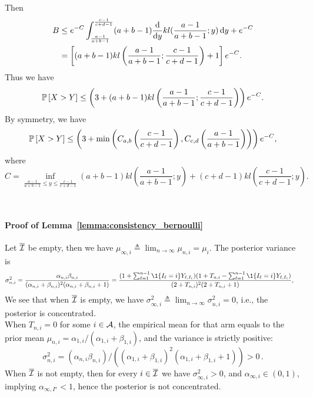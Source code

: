 	Then
	\begin{align*}
	B &\leq e^{-C} \int_{\frac{a-1}{a+b-1}}^{\frac{c-1}{c+d-1}} (a+b-1) \frac{\mathop{}\!\mathrm{d}{}}{\mathop{}\!\mathrm{d}{y}} kl (\frac{a-1}{a+b-1}; y) \mathop{}\!\mathrm{d}{y}  + e^{-C} \\
	&= \left[ (a+b-1) kl\left(\frac{a-1}{a+b-1}; \frac{c-1}{c+d-1}\right)  + 1 \right] e^{-C}.
	\end{align*}
	Thus we have
	\begin{align*}
	\mathbb{P}\left[X > Y\right] \leq \left( 3 + (a+b-1) kl\left(\frac{a-1}{a+b-1}; \frac{c-1}{c+d-1}\right)  \right) e^{-C}.
	\end{align*}
	By symmetry, we have
	\begin{align*}
	\mathbb{P}\left[X > Y\right] \leq \left(3 + \min \left(C_{a,b}\left(\frac{c-1}{c+d-1}\right), C_{c,d}\left(\frac{a-1}{a+b-1}\right)\right)\right) e^{-C},
	\end{align*}
	where
	\[
	    C = \inf_{\frac{a-1}{a+b-1} \leq y \leq \frac{c-1}{c+d-1}} (a+b-1) kl\left(\frac{a-1}{a+b-1}; y\right) + (c+d-1) kl\left(\frac{c-1}{c+d-1} ; y\right).
	\]

\hfill\BlackBox\\[2mm]

\paragraph{Proof of Lemma~\ref{lemma:consistency_bernoulli}} 

Let $\overline{\mathcal{I}}$ be empty, then we have $\mu_{\infty, i} \triangleq \lim_{n \rightarrow \infty} \mu_{n,i} = \mu_i$. The posterior variance is
\begin{align*}
\sigma_{n,i}^2 &= \frac{\alpha_{n,i}\beta_{n,i}}{(\alpha_{n,i}+ \beta_{n,i})^2 (\alpha_{n,i} + \beta_{n,i} + 1)} 
= \frac{(1 + \sum_{\ell=1}^{n-1} \1{\{ I_{\ell} = i \}} Y_{\ell,I_{\ell}}) (1 + T_{n,i} - \sum_{\ell=1}^{n-1} \1{\{ I_{\ell} = i \}} Y_{\ell,I_{\ell}})  }{ (2 + T_{n,i})^2 (2 + T_{n,i} +1 )   },
\end{align*}
We see that when $\overline{\mathcal{I}}$ is empty, we have $\sigma_{\infty, i}^2 \triangleq \lim_{n \rightarrow \infty} \sigma_{n,i}^2 = 0$, i.e., the posterior is concentrated. \\

When $T_{n,i} = 0$ for some $i \in \mathcal{A}$, the empirical mean for that arm equals to the prior mean $\mu_{n,i} = \alpha_{1,i} / (\alpha_{1,i} + \beta_{1,i})$, and the variance is strictly positive: 
\[
    \sigma^2_{n,i} = (\alpha_{n,i}\beta_{n,i}) / \left((\alpha_{1,i}+ \beta_{1,i})^2 (\alpha_{1,i} + \beta_{1,i} + 1) \right) > 0\,.
\] 
When $\overline{\mathcal{I}}$ is not empty, then for every $i \in \overline{\mathcal{I}}$ we have $\sigma_{\infty, i}^2 > 0$, and $\alpha_{\infty, i} \in (0,1)$, implying $\alpha_{\infty, I^\star} < 1$, hence the posterior is not concentrated. 

\hfill\BlackBox\\[2mm]
